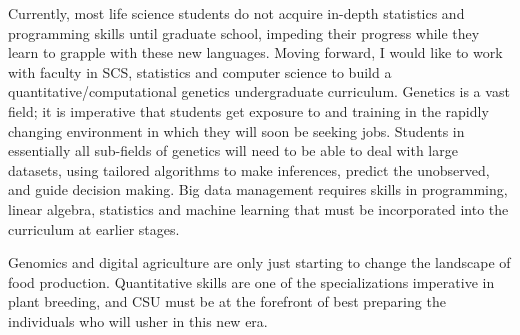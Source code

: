 \documentclass[11pt]{article}
\begin{document}
Currently, most life science students do not acquire in-depth statistics and programming skills until graduate school, impeding their progress while they learn to grapple with these new languages. Moving forward, I would like to work with faculty in SCS, statistics and computer science to build a quantitative/computational genetics undergraduate curriculum. Genetics is a vast field; it is imperative that students get exposure to and training in the rapidly changing environment in which they will soon be seeking jobs. Students in essentially all sub-fields of genetics will need to be able to deal with large datasets, using tailored algorithms to make inferences, predict the unobserved, and guide decision making. Big data management requires skills in programming, linear algebra, statistics and machine learning that must be incorporated into the curriculum at earlier stages.



Genomics and digital agriculture are only just starting to change the landscape of food production. Quantitative skills are one of the specializations imperative in plant breeding, and CSU must be at the forefront of best preparing the individuals who will usher in this new era.
\end{document}
